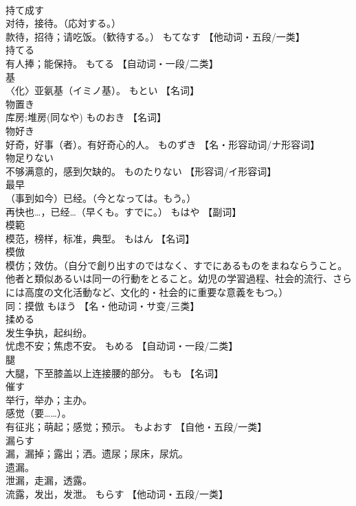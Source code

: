\documentclass[8pt]{extreport}
\begin{document}
\begin{CJK}{UTF8}{min}
\\	持て成す	
\\	对待，接待。（応対する。） 
\\	款待，招待；请吃饭。（歓待する。）	もてなす		【他动词・五段/一类】
\\	持てる	
\\	有人捧；能保持。	もてる		【自动词・一段/二类】
\\	基	
\\	〈化〉亚氨基（イミノ基）。	もとい		【名词】
\\	物置き	
\\	库房;堆房(同なや)	ものおき		【名词】
\\	物好き	
\\	好奇，好事（者）。有好奇心的人。	ものずき		【名・形容动词/ナ形容词】
\\	物足りない	
\\	不够满意的，感到欠缺的。	ものたりない		【形容词/イ形容词】
\\	最早	
\\	（事到如今）已经。（今となっては。もう。） 
\\	再快也…，已经…（早くも。すでに。）	もはや		【副词】
\\	模範	
\\	模范，榜样，标准，典型。	もはん		【名词】
\\	模倣	
\\	模仿；效仿。（自分で創り出すのではなく、すでにあるものをまねならうこと。他者と類似あるいは同一の行動をとること。幼児の学習過程、社会的流行、さらには高度の文化活動など、文化的・社会的に重要な意義をもつ。） 
\\	同：摸倣	もほう		【名・他动词・サ变/三类】
\\	揉める	
\\	发生争执，起纠纷。 
\\	忧虑不安；焦虑不安。	もめる		【自动词・一段/二类】
\\	腿	
\\	大腿，下至膝盖以上连接腰的部分。	もも		【名词】
\\	催す	
\\	举行，举办；主办。 
\\	感觉（要……）。 
\\	有征兆；萌起；感觉；预示。	もよおす		【自他・五段/一类】
\\	漏らす	
\\	漏，漏掉；露出；洒。遗尿；尿床，尿炕。 
\\	遗漏。 
\\	泄漏，走漏，透露。 
\\	流露，发出，发泄。	もらす		【他动词・五段/一类】

\end{CJK}
\end{document}
